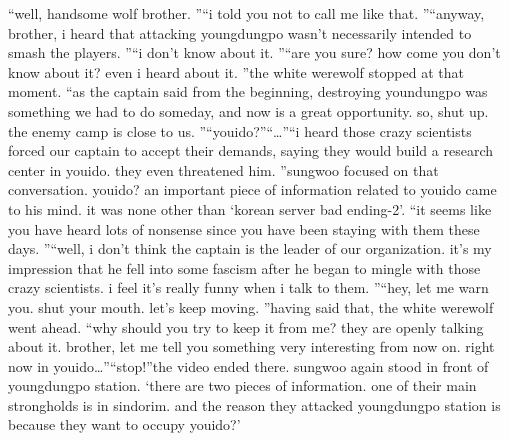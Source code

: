 “well, handsome wolf brother.
”“i told you not to call me like that.
”“anyway, brother, i heard that attacking youngdungpo wasn’t necessarily intended to smash the players.
”“i don’t know about it.
”“are you sure? how come you don’t know about it? even i heard about it.
”the white werewolf stopped at that moment.
“as the captain said from the beginning, destroying youndungpo was something we had to do someday, and now is a great opportunity.
 so, shut up.
 the enemy camp is close to us.
”“youido?”“…”“i heard those crazy scientists forced our captain to accept their demands, saying they would build a research center in youido.
 they even threatened him.
”sungwoo focused on that conversation.
 youido? an important piece of information related to youido came to his mind.
it was none other than ‘korean server bad ending-2’.
“it seems like you have heard lots of nonsense since you have been staying with them these days.
”“well, i don’t think the captain is the leader of our organization.
 it’s my impression that he fell into some fascism after he began to mingle with those crazy scientists.
 i feel it’s really funny when i talk to them.
”“hey, let me warn you.
 shut your mouth.
 let’s keep moving.
”having said that, the white werewolf went ahead.
“why should you try to keep it from me? they are openly talking about it.
 brother, let me tell you something very interesting from now on.
 right now in youido…”“stop!”the video ended there.
sungwoo again stood in front of youngdungpo station.
‘there are two pieces of information.
 one of their main strongholds is in sindorim.
 and the reason they attacked youngdungpo station is because they want to occupy youido?’

